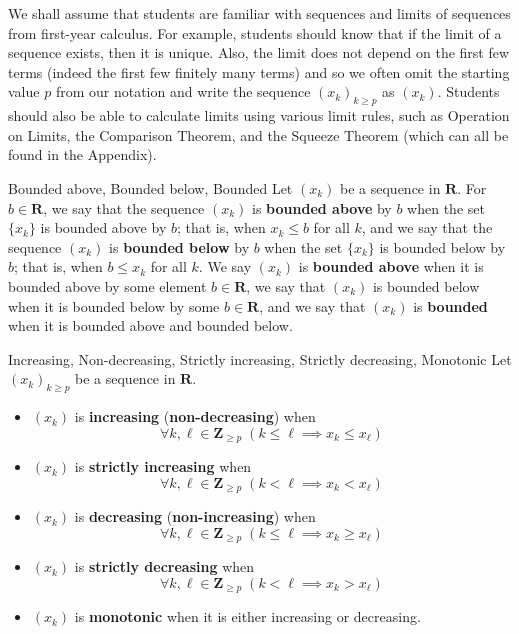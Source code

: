 \begin{Remark}{}{}
    We shall assume that students are familiar with sequences and limits
    of sequences from first-year calculus. For example, students should know that if
    the limit of a sequence exists, then it is unique. Also, the limit does not depend
    on the first few terms (indeed the first few finitely many terms)
    and so we often omit the starting value $ p $ from our
    notation and write the sequence $ (x_k)_{k\ge p} $ as $ (x_k) $.
    Students should also be able to calculate limits using various
    limit rules, such as Operation on Limits,
    the Comparison Theorem, and the Squeeze Theorem (which can
    all be found in the Appendix).
\end{Remark}
\begin{Definition}{Bounded above, Bounded below, Bounded}{}
    Let $ (x_{k}) $ be a sequence in $ \mathbf{R} $.
    For $ b \in \mathbf{R} $, we say that the sequence
    $ (x_{k}) $ is \textbf{bounded above}
    by $ b $ when the set $\{x_{k}\}$ is bounded above by $ b $;
    that is, when $x_{k} \le b$ for all $ k $, and we say that the sequence
    $ (x_{k}) $ is \textbf{bounded below} by $ b $ when the set $ \{x_{k}\} $
    is bounded below by $ b $; that is, when $ b \le x_{k} $ for all $ k $.
    We say $(x_{k})$ is \textbf{bounded above} when it is bounded above
    by some element $ b \in \mathbf{R} $, we say that $ (x_{k}) $ is
    bounded below when it is bounded below by some $ b \in \mathbf{R} $, and
    we say that $ (x_{k}) $ is \textbf{bounded} when it is bounded above
    and bounded below.
\end{Definition}
\begin{Definition}{Increasing, Non-decreasing, Strictly increasing, Strictly
        decreasing, Monotonic}{}
    Let $ (x_k)_{k\ge p} $ be a sequence in $ \mathbf{R} $.
    \begin{itemize}
        \item $ (x_k) $ is \textbf{increasing} (\textbf{non-decreasing}) when
              \[ \forall k,\ell\in\mathbf{Z}_{\ge p}\;(k\le \ell\implies x_k\le x_\ell) \]
        \item $ (x_k) $ is \textbf{strictly increasing} when
              \[ \forall k,\ell\in\mathbf{Z}_{\ge p}\;(k< \ell\implies x_k< x_\ell) \]
        \item $ (x_k) $ is \textbf{decreasing} (\textbf{non-increasing}) when
              \[ \forall k,\ell\in\mathbf{Z}_{\ge p}\;(k\le \ell\implies x_k\ge x_\ell) \]
        \item $ (x_k) $ is \textbf{strictly decreasing} when
              \[ \forall k,\ell\in\mathbf{Z}_{\ge p}\;(k< \ell\implies x_k> x_\ell) \]
        \item $ (x_k) $ is \textbf{monotonic} when it is either
              increasing or decreasing.
    \end{itemize}
\end{Definition}
